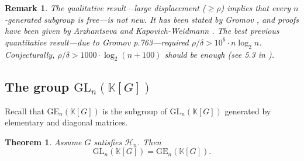 \documentclass[11pt,letterpaper]{amsart}
\newtheorem{theorem}{Theorem}
\newtheorem*{remark}{Remark}
\begin{document}
\begin{remark}
The qualitative result---large displacement ($\geq \rho$) implies that every $n$-generated subgroup is free---is not new. It has been stated by Gromov \cite{gromovhyperbolic}, and proofs have been given by Arzhantseva \cite{arzhantseva} and Kapovich-Weidmann \cite{kapovichweidmann}. The best previous quantitative result---due to Gromov \cite{gromovexpanders} p.763---required  $\rho/\delta>10^6\cdot n\log_2n$. Conjecturally, $\rho/\delta>1000\cdot \log_2(n+100)$ should be enough (see 5.3 in \cite{gromovhyperbolic}).%

\end{remark}

\subsection{The group $\text{GL}_n (\mathbb{K} [G])$}
Recall that $\text{GE}_n (\mathbb{K} [G])$ is the subgroup of $\text{GL}_n (\mathbb{K} [G])$ generated by elementary and diagonal matrices. %

\begin{theorem}
\label{gltheorem}
Assume $G$ satisfies ${\mathcal{H}_{n}}$. Then 
$$
\mathrm{GL}_n (\mathbb{K} [G])=\mathrm{GE}_n (\mathbb{K} [G]).
$$
\end{theorem}
\end{document}
